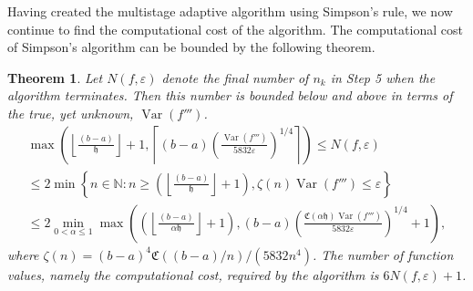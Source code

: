 \documentclass{iitthesis}
\DeclareMathOperator{\Var}{Var}
\newtheorem{theorem}{Theorem}
\theoremstyle{definition}
\theoremstyle{remark}
\begin{document}
Having created the multistage adaptive algorithm using Simpson's rule, we now continue to find the computational cost of the algorithm. The computational cost of Simpson's algorithm can be bounded by the following theorem.
\begin{theorem}\label{uppbndcostSimp}
    Let $N(f,\varepsilon)$ denote the final number of $n_k$ in Step 5 when the algorithm terminates. Then this number is bounded below and above in terms of the true, yet unknown, $\Var(f''')$.
    \begin{multline}\label{uppbndcostineq}
        \max\left(\left\lfloor\frac{(b-a)}{\mathfrak{h}}\right\rfloor+1,\left\lceil(b-a)\left(\frac{\Var(f''')}{5832\varepsilon}\right)^{1/4}\right\rceil\right)\leq N(f,\varepsilon)\\ \leq 2\min\left\{n\in\mathbb{N}:n\geq\left(\left\lfloor\frac{(b-a)}{\mathfrak{h}}\right\rfloor+1\right),\zeta(n)\Var(f''')\leq\varepsilon\right\}\\ \leq 2\min_{0<\alpha\leq1}\max\left(\left(\left\lfloor\frac{(b-a)}{\alpha\mathfrak{h}}\right\rfloor+1\right),(b-a)\left(\frac{\mathfrak{C}(\alpha\mathfrak{h})\Var(f''')}{5832\varepsilon}\right)^{1/4}+1\right),
    \end{multline}
    where $\zeta(n)=(b-a)^4\mathfrak{C}((b-a)/n)/(5832n^4)$. The number of function values, namely the computational cost, required by the algorithm is $6N(f,\varepsilon)+1$.
\end{theorem}
\end{document}
